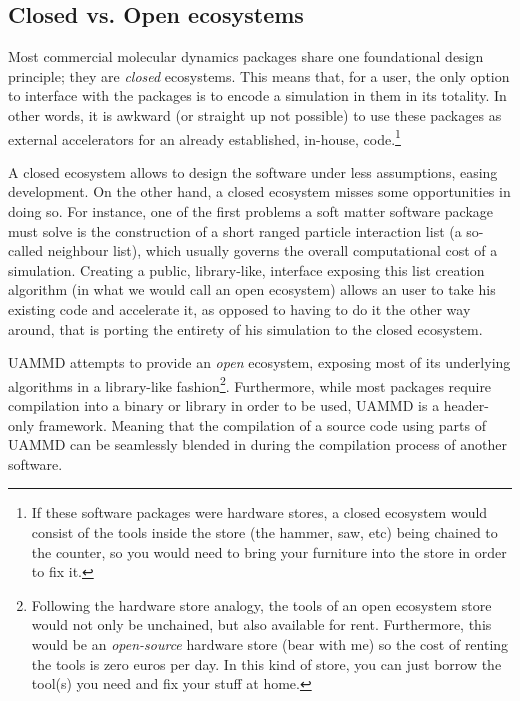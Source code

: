 \documentclass[ twoside,openright,titlepage,numbers=noenddot,%
headinclude,footinclude,cleardoublepage=empty,abstract=on,
BCOR=5mm,paper=b5,fontsize=11pt, dvipsnames
]{scrreprt}
\newcommand{\uammd}{\gls{UAMMD}\xspace}
\newcommand{\gpu}{\gls{GPU}\xspace}
\begin{document}
\subsection*{Closed vs. Open ecosystems}
Most commercial molecular dynamics packages share one foundational design principle; they are \emph{closed} ecosystems. This means that, for a user, the only option to interface with the packages is to encode a simulation in them in its totality. In other words, it is awkward (or straight up not possible) to use these packages as external accelerators for an already established, in-house, code.\footnote{If these software packages were hardware stores, a closed ecosystem would consist of the tools inside the store (the hammer, saw, etc) being chained to the counter, so you would need to bring your furniture into the store in order to fix it.}  

A closed ecosystem allows to design the software under less assumptions, easing development. On the other hand, a closed ecosystem misses some opportunities in doing so. For instance, one of the first problems a soft matter software package must solve is the construction of a short ranged particle interaction list (a so-called neighbour list), which usually governs the overall computational cost of a simulation. Creating a public, library-like, interface exposing this list creation algorithm (in what we would call an open ecosystem) allows an user to take his existing code and accelerate it, as opposed to having to do it the other way around, that is porting the entirety of his simulation to the closed ecosystem.

\uammd attempts to provide an \emph{open} ecosystem, exposing most of its underlying algorithms in a library-like fashion\footnote{Following the hardware store analogy, the tools of an open ecosystem store would not only be unchained, but also available for rent. Furthermore, this would be an \emph{open-source} hardware store (bear with me) so the cost of renting the tools is zero euros per day. In this kind of store, you can just borrow the tool(s) you need and fix your stuff at home.}.
Furthermore, while most packages require compilation into a binary or library in order to be used, \uammd is a header-only framework. Meaning that the compilation of a source code using parts of \uammd can be seamlessly blended in during the compilation process of another software.


\newpage
\cleardoublepage
  
\end{document}
